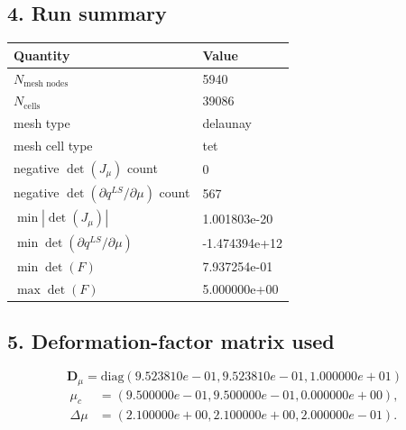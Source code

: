 \documentclass[11pt]{article}
\begin{document}
\subsection*{4. Run summary}
\begin{center}
\begin{tabular}{ll}
\toprule
Quantity & Value \\
\midrule
$N_\text{mesh nodes}$ & 5940 \\
$N_\text{cells}$ & 39086 \\
mesh type & delaunay \\
mesh cell type & tet \\
negative $\det(J_\mu)$ count & 0 \\
negative $\det(\partial q^{LS}/\partial\mu)$ count & 567 \\
$\min |\det(J_\mu)|$ & 1.001803e-20 \\
$\min\det(\partial q^{LS}/\partial\mu)$ & -1.474394e+12 \\
$\min\det(F)$ & 7.937254e-01 \\
$\max\det(F)$ & 5.000000e+00 \\
\bottomrule
\end{tabular}
\end{center}
\subsection*{5. Deformation-factor matrix used}
\begin{equation}
\mathbf{D}_{\mu}=\mathrm{diag}\left(9.523810e-01,9.523810e-01,1.000000e+01\right)\end{equation}
\begin{align}
\mu_c &= \left(9.500000e-01,9.500000e-01,0.000000e+00\right),\\
\Delta\mu &= \left(2.100000e+00,2.100000e+00,2.000000e-01\right).
\end{align}
\end{document}
